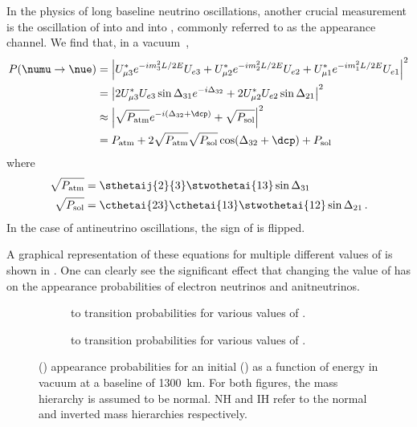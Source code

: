 In the physics of long baseline neutrino oscillations, another crucial measurement is the oscillation of \numu into \nue and \anumu into \anue, commonly referred to as the appearance channel.
We find that, in a vacuum~\cite{Nunokawa_2008},
\begin{align}
  P(\numu \rightarrow \nue) &= \left| U^{*}_{\mu 3} e^{-im_{3}^{2}L/2E} U_{e3} + U^{*}_{\mu 2} e^{-im_{2}^{2}L/2E} U_{e2} + U^{*}_{\mu 1}e^{-im_{1}^{2}L/2E}U_{e1} \right|^{2} \\
  &= \left| 2U_{\mu 3}^{*}U_{e3} \sin \Delta_{31} e^{-i \Delta_{32}} + 2U^{*}_{\mu 2}U_{e2} \sin \Delta_{21} \right|^{2} \\
  & \approx \left| \sqrt{P_{\text{atm}}} e^{-i(\Delta_{32}+\dcp)} + \sqrt{P_{\text{sol}}} \right|^{2} \\
  &= P_{\text{atm}} + 2 \sqrt{P_{\text{atm}}} \sqrt{P_{\text{sol}}} \cos(\Delta_{32}+\dcp) + P_{\text{sol}}
  \label{eq:threeNuApp}
\end{align}
where
\begin{align}
  \sqrt{P_{\text{atm}}} &= \sthetaij{2}{3} \stwothetai{13} \sin\Delta_{31} \\
  \sqrt{P_{\text{sol}}} &= \cthetai{23} \cthetai{13} \stwothetai{12} \sin\Delta_{21} \, .
\end{align}
In the case of antineutrino oscillations, the sign of \dcp is flipped.

A graphical representation of these equations for multiple different values of \dcp is shown in .
One can clearly see the significant effect that changing the value of \dcp has on the appearance probabilities of electron neutrinos and anitneutrinos.

\begin{figure}[h]
  \centering
  \begin{subfigure}[t]{0.49\textwidth}
    \begin{adjustbox}{max totalsize={\textwidth}, center}
      
    \end{adjustbox}
    \caption{\numu to \nue transition probabilities for various values of \dcp.}
  \end{subfigure}
  \hfill
  \begin{subfigure}[t]{0.49\textwidth}
    \begin{adjustbox}{max totalsize={\textwidth}, center}
      
    \end{adjustbox}
    \caption{\anumu to \anue transition probabilities for various values of \dcp.}
  \end{subfigure}
  \caption{\nue(\anue) appearance probabilities for an initial \numu(\anumu) as a function of energy in vacuum at a baseline of 1300~km. For both figures, the mass hierarchy is assumed to be normal. NH and IH refer to the normal and inverted mass hierarchies respectively.}
  \label{fig:threeNuApp}
\end{figure}

